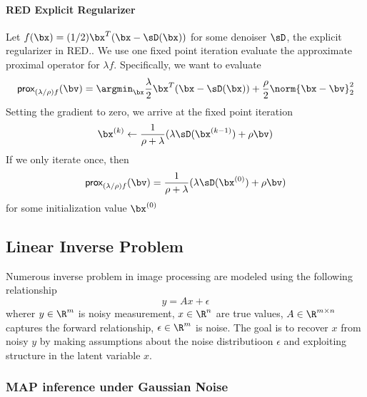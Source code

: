 \documentclass[../writeup.tex]{subfiles}
\begin{document}
\paragraph{RED Explicit Regularizer}

Let $f(\bx) = (1/2)\bx^T(\bx-\sD(\bx))$ for some denoiser $\sD$, the explicit regularizer in RED.\cite{romanoLittleEngineThat2016}. We use one fixed point iteration evaluate the approximate proximal operator for $\lambda f$. Specifically, we want to evaluate 
\[
    \prox_{(\lambda/\rho)f} (\bv)
        = \argmin_{\bx} \frac{\lambda}{2}\bx^T(\bx-\sD(\bx)) + \frac{\rho}{2} \norm{\bx-\bv}_2^2
\]
Setting the gradient to zero, we arrive at the fixed point iteration
\[
    \bx^{(k)} \leftarrow \frac{1}{\rho+\lambda}(
        \lambda \sD(\bx^{(k-1)}) + \rho \bv
    )
\]
If we only iterate once, then 
\[
    \prox_{(\lambda/\rho)f} (\bv)
        = \frac{1}{\rho+\lambda}( \lambda \sD(\bx^{(0)}) + \rho \bv )
\]
for some initialization value $\bx^{(0)}$



\subsection{Linear Inverse Problem}

Numerous inverse problem in image processing are modeled using the following relationship
\[
    y = Ax + \epsilon   
\]
wherer $y\in\R^m$ is noisy measurement, $x\in\R^n$ are true values, $A \in \R^{m\times n}$ captures the forward relationship, $\epsilon\in\R^m$ is noise. The goal is to recover $x$ from noisy $y$ by making assumptions about the noise distributioon $\epsilon$ and exploiting structure in the latent variable $x$.


\subsubsection{MAP inference under Gaussian Noise}
\end{document}
